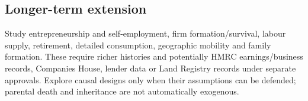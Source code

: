 \subsection{Longer-term extension}
Study entrepreneurship and self-employment, firm formation/survival, labour supply, retirement, detailed consumption, geographic mobility and family formation. These require richer histories and potentially HMRC earnings/business records, Companies House, lender data or Land Registry records under separate approvals. Explore causal designs only when their assumptions can be defended; parental death and inheritance are not automatically exogenous.
